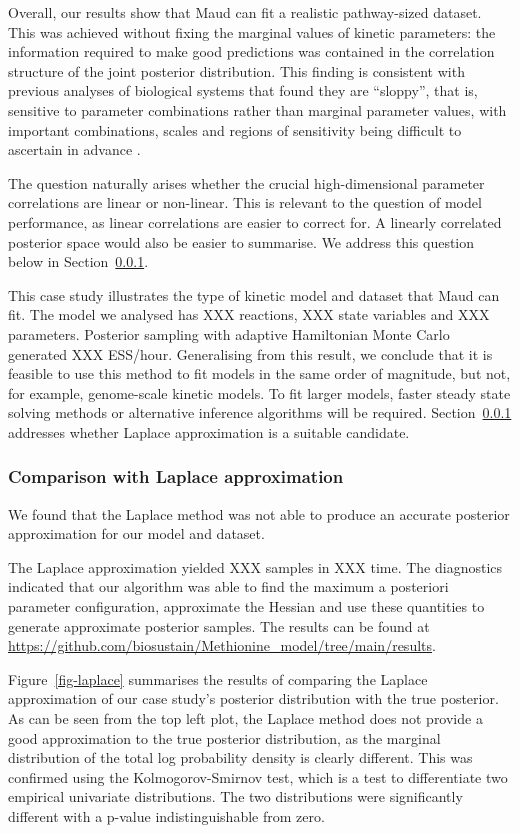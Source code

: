 \documentclass[journal=,manuscript=]{achemso}
\begin{document}
Overall, our results show that Maud can fit a realistic pathway-sized
dataset. This was achieved without fixing the marginal values of kinetic
parameters: the information required to make good predictions was
contained in the correlation structure of the joint posterior
distribution. This finding is consistent with previous analyses of
biological systems that found they are ``sloppy'', that is, sensitive to
parameter combinations rather than marginal parameter values, with
important combinations, scales and regions of sensitivity being
difficult to ascertain in advance
\citep{gutenkunst_2007, poirier_revising_1998}.

The question naturally arises whether the crucial high-dimensional
parameter correlations are linear or non-linear. This is relevant to the
question of model performance, as linear correlations are easier to
correct for. A linearly correlated posterior space would also be easier
to summarise. We address this question below in
Section~\ref{sec-laplace}.

This case study illustrates the type of kinetic model and dataset that
Maud can fit. The model we analysed has XXX reactions, XXX state
variables and XXX parameters. Posterior sampling with adaptive
Hamiltonian Monte Carlo generated XXX ESS/hour. Generalising from this
result, we conclude that it is feasible to use this method to fit models
in the same order of magnitude, but not, for example, genome-scale
kinetic models. To fit larger models, faster steady state solving
methods or alternative inference algorithms will be required.
Section~\ref{sec-laplace} addresses whether Laplace approximation is a
suitable candidate.

\hypertarget{sec-laplace}{%
\subsubsection{Comparison with Laplace
approximation}\label{sec-laplace}}

We found that the Laplace method was not able to produce an accurate
posterior approximation for our model and dataset.

The Laplace approximation yielded XXX samples in XXX time. The
diagnostics indicated that our algorithm was able to find the maximum a
posteriori parameter configuration, approximate the Hessian and use
these quantities to generate approximate posterior samples. The results
can be found at
\url{https://github.com/biosustain/Methionine_model/tree/main/results}.

Figure~\ref{fig-laplace} summarises the results of comparing the Laplace
approximation of our case study's posterior distribution with the true
posterior. As can be seen from the top left plot, the Laplace method
does not provide a good approximation to the true posterior
distribution, as the marginal distribution of the total log probability
density is clearly different. This was confirmed using the
Kolmogorov-Smirnov test, which is a test to differentiate two empirical
univariate distributions. The two distributions were significantly
different with a p-value indistinguishable from zero.
\end{document}
